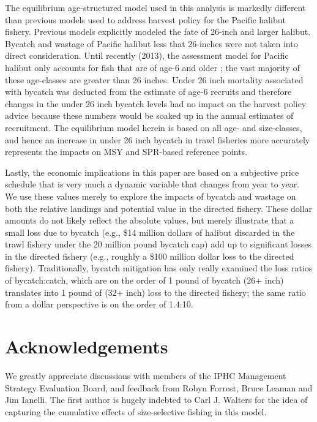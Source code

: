 \documentclass[12pt,leqno]{article}
\begin{document}
The equilibrium age-structured model used in this analysis is markedly different than previous models used to address harvest policy for the Pacific halibut fishery.  Previous models explicitly modeled the fate of 26-inch and larger halibut.  Bycatch and wastage of Pacific halibut less that 26-inches were not taken into direct consideration.  Until recently (2013), the assessment model for Pacific halibut only accounts for fish that are of age-6 and older \cite{clark2006assessment}; the vast majority of these age-classes are greater than 26 inches. Under 26 inch mortality associated with bycatch was deducted from the estimate of age-6 recruits and therefore changes in the under 26 inch bycatch levels had no impact on the harvest policy advice because these numbers would be soaked up in the annual estimates of recruitment.  The equilibrium model herein is based on all age- and size-classes, and hence an increase in under 26 inch bycatch in trawl fisheries more accurately represents the impacts on MSY and SPR-based reference points.

Lastly, the economic implications in this paper are based on a subjective price schedule that is very much a dynamic variable that changes from year to year.  We use these values merely to explore the impacts of bycatch and wastage on both the relative landings and potential value in the directed fishery.  These dollar amounts do not likely reflect the absolute values, but merely illustrate that a small loss due to bycatch (e.g., \$14 million dollars of halibut discarded in the trawl fishery under the 20 million pound bycatch cap) add up to significant losses in the directed fishery (e.g., roughly a \$100 million dollar loss to the directed fishery).  Traditionally, bycatch mitigation has only really examined the loss ratios of bycatch:catch, which are on the order of 1 pound of bycatch (26+ inch) translates into 1 pound of (32+ inch) loss to the directed fishery; the same ratio from a dollar perspective is on the order of 1.4:10.

\section*{Acknowledgements}

We greatly appreciate discussions with members of the IPHC Management Strategy Evaluation Board, and feedback from Robyn Forrest, Bruce Leaman and Jim Ianelli. The first author is hugely indebted to Carl J. Walters for the idea of capturing the cumulative effects of size-selective fishing in this model.





\appendix
% 
%
\end{document}
